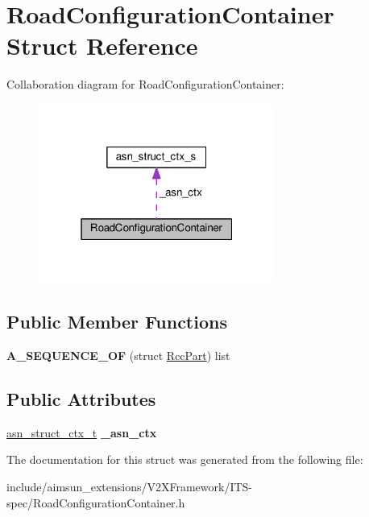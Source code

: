 \hypertarget{structRoadConfigurationContainer}{}\section{Road\+Configuration\+Container Struct Reference}
\label{structRoadConfigurationContainer}


Collaboration diagram for Road\+Configuration\+Container\+:\nopagebreak
\begin{figure}[H]
\begin{center}
\leavevmode
\includegraphics[width=220pt]{structRoadConfigurationContainer__coll__graph}
\end{center}
\end{figure}
\subsection*{Public Member Functions}
\begin{DoxyCompactItemize}
\item 
{\bfseries A\+\_\+\+S\+E\+Q\+U\+E\+N\+C\+E\+\_\+\+OF} (struct \hyperlink{structRccPart}{Rcc\+Part}) list\hypertarget{structRoadConfigurationContainer_aee9ded63b960d6ccdc7adca766a3c57c}{}\label{structRoadConfigurationContainer_aee9ded63b960d6ccdc7adca766a3c57c}

\end{DoxyCompactItemize}
\subsection*{Public Attributes}
\begin{DoxyCompactItemize}
\item 
\hyperlink{structasn__struct__ctx__s}{asn\+\_\+struct\+\_\+ctx\+\_\+t} {\bfseries \+\_\+asn\+\_\+ctx}\hypertarget{structRoadConfigurationContainer_a78ea7466e37ee8e3052d4c3fb30b83c8}{}\label{structRoadConfigurationContainer_a78ea7466e37ee8e3052d4c3fb30b83c8}

\end{DoxyCompactItemize}


The documentation for this struct was generated from the following file\+:\begin{DoxyCompactItemize}
\item 
include/aimsun\+\_\+extensions/\+V2\+X\+Framework/\+I\+T\+S-\/spec/Road\+Configuration\+Container.\+h\end{DoxyCompactItemize}
